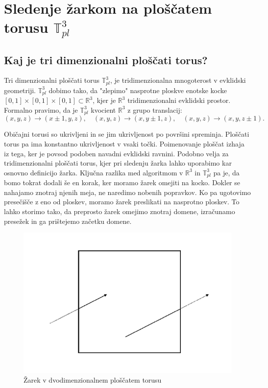 \documentclass[titlepage]{article}
\begin{document}
\section{\texorpdfstring{Sledenje žarkom na ploščatem torusu \( \mathbb{T}_{pl}^{3} \)}{Sledenje žarkom na ploščatem torusu}}

\subsection{Kaj je tri dimenzionalni ploščati torus?}
Tri dimenzionalni ploščati torus \( \mathbb{T}^3_{pl} \), je tridimenzionalna mnogoterost v evklidski geometriji. \( \mathbb{T}^3_{pl} \) dobimo tako, da "zlepimo" nasprotne ploskve enotske kocke \([0,1] \times [0,1] \times [0,1] \subset \mathbb{R}^3 \), kjer je \(\mathbb{R}^3\) tridimenzionalni evklidski prostor. Formalno pravimo, da je \( \mathbb{T}^3_{pl} \) kvocient \(\mathbb{R}^3\) z grupo translacij:
\[
(x, y, z) \to (x \pm 1, y, z), \quad (x, y, z) \to (x, y \pm 1, z), \quad (x, y, z) \to (x, y, z \pm 1).
\]

Običajni torusi so ukrivljeni in se jim ukrivljenost po površini spreminja. Ploščati torus pa ima konstantno ukrivljenost v vsaki točki. Poimenovanje ploščat izhaja iz tega, ker je povsod podoben navadni evklidski ravnini. Podobno velja za tridimenzionalni ploščati torus, kjer pri sledenju žarka lahko uporabimo kar osnovno definicijo žarka. Ključna razlika med algoritmom v \( \mathbb{R}^3 \) in \( \mathbb{T}^3_{pl} \) pa je, da bomo tokrat dodali še en korak, ker moramo žarek omejiti na kocko. Dokler se nahajamo znotraj njenih meja, ne naredimo nobenih popravkov. Ko pa ugotovimo presečišče z eno od ploskev, moramo žarek preslikati na nasprotno ploskev. To lahko storimo tako, da preprosto žarek omejimo znotraj domene, izračunamo presežek in ga prištejemo začetku domene.

\begin{figure}[H]
    \centering
    \includegraphics[width=0.5\linewidth]{Images/flat_torus_zrcaljenje.png}
    \caption{Žarek v dvodimenzionalnem ploščatem torusu}
    \label{Slika:Žarek v dvodimenzionalnem ploščatem torusu}
\end{figure}
\end{document}
